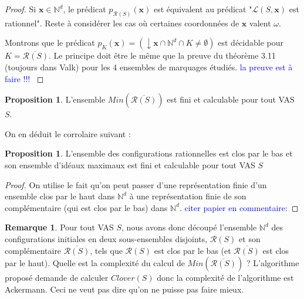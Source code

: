 \documentclass[a4paper,final]{article}
\theoremstyle{definition}
\newtheorem{Proposition}[Theorem]{Proposition}
\newtheorem*{Remark}{Remarque}
\newcommand{\alain}[1]{\textcolor{blue}{#1}}
\newcommand{\Min}{\textit{Min}}
\newcommand{\N}{\ensuremath{\mathbb{N}}}
\newcommand{\lang}{\ensuremath{\mathcal{L}}}
\newcommand{\clover}{\textit{Clover}}
\newcommand{\vect}[1]{\ensuremath{\mathbf{#1}}}
\newcommand{\inirat}{\mathcal{R}}
\begin{document}
\begin{proof}
Si $\vect{x}\in\N^d$, le prédicat $p_{\overline{\inirat(S)}}(\vect{x})$ est équivalent au prédicat "$\lang(S,\vect{x})$ est rationnel".
Reste à considérer les cas où certaines coordonnées de $\vect{x}$ valent $\omega$.

Montrons que le prédicat $p_K(\vect{x})=(\downarrow \vect{x} \cap \N^d \cap K \neq \emptyset)$ est décidable pour $K=\overline{\inirat(S)}$. Le principe doit être le même que la preuve du théorème 3.11 (toujours dans Valk) pour les 4 ensembles de marquages étudiés.
\alain{la preuve est à faire !!! }
\end{proof}


\begin{Proposition}\label{minimaux}
L'ensemble $\Min(\overline{\inirat(S)})$ est fini et calculable pour tout VAS $S$.
\end{Proposition}

On en déduit le corrolaire suivant :

\begin{Proposition}\label{maximaux}
L'ensemble des configurations rationnelles est clos par le bas et son ensemble d'idéaux maximaux est fini et calculable pour tout VAS $S$ 
\end{Proposition}

\begin{proof}
On utilise le fait qu'on peut passer d'une représentation finie d'un ensemble clos par le haut dans $\N^d$ à une représentation finie de son complémentaire (qui est clos par le bas) dans $\N^d$.
\alain{citer papier en commentaire:}
\end{proof}

\begin{Remark}
Pour tout VAS $S$, nous avons donc découpé l'ensemble $\N^d$ des configurations initiales en deux sous-ensembles disjoints, $\inirat(S)$ et son complémentaire $\overline{\inirat(S)}$, tels que $\inirat(S)$ est clos par le bas (et $\overline{\inirat(S)}$ est clos par le haut).
Quelle est la complexité du calcul de $\Min(\overline{\inirat(S)})$ ? L'algorithme proposé demande de calculer $\clover(S)$ donc la complexité de l'algorithme est Ackermann. Ceci ne veut pas dire qu'on ne puisse pas faire mieux. 
\end{Remark}
\end{document}
